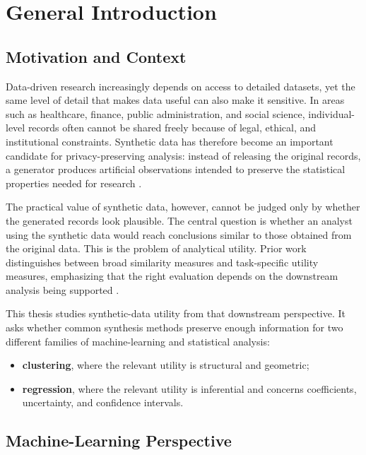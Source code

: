 \chapter{General Introduction}
\label{chap:general-introduction}

\section{Motivation and Context}
\label{sec:general-motivation}

Data-driven research increasingly depends on access to detailed datasets, yet the same level of detail that makes data useful can also make it sensitive. In areas such as healthcare, finance, public administration, and social science, individual-level records often cannot be shared freely because of legal, ethical, and institutional constraints. Synthetic data has therefore become an important candidate for privacy-preserving analysis: instead of releasing the original records, a generator produces artificial observations intended to preserve the statistical properties needed for research \cite{rubin1993, little1993, nowok2016}.

The practical value of synthetic data, however, cannot be judged only by whether the generated records look plausible. The central question is whether an analyst using the synthetic data would reach conclusions similar to those obtained from the original data. This is the problem of analytical utility. Prior work distinguishes between broad similarity measures and task-specific utility measures, emphasizing that the right evaluation depends on the downstream analysis being supported \cite{snoke2018}.

This thesis studies synthetic-data utility from that downstream perspective. It asks whether common synthesis methods preserve enough information for two different families of machine-learning and statistical analysis:
\begin{itemize}
  \item \textbf{clustering}, where the relevant utility is structural and geometric;
  \item \textbf{regression}, where the relevant utility is inferential and concerns coefficients, uncertainty, and confidence intervals.
\end{itemize}

\section{Machine-Learning Perspective}
\label{sec:general-ml-perspective}

